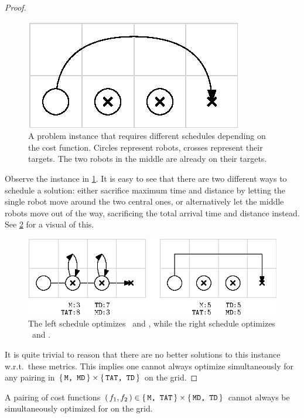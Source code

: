 \begin{proof}
	\begin{figure}[h]
		\centering
		\includegraphics[width=0.35\linewidth]{ipe/sim1_problem.eps}
		\caption{
			A problem instance that requires different schedules depending on the cost function. Circles represent robots, crosses represent their targets. The two robots in the middle are already on their targets.
		}
		\label{fig:simultaneous_problem_1}
	\end{figure}

	Observe the instance in \cref{fig:simultaneous_problem_1}. 
	It is easy to see that there are two different ways to schedule a solution: either sacrifice maximum time and distance by letting the single robot move around the two central ones, or alternatively let the middle robots move out of the way, sacrificing the total arrival time and distance instead.
	See \cref{fig:simumtaneous_strategies_1} for a visual of this.

	\begin{figure}[h]
		\centering
		\includegraphics[width=0.7\linewidth]{ipe/sim1_strat.eps}
		\caption{
			The left schedule optimizes \ and , while the right schedule optimizes \ and .
		}
		\label{fig:simumtaneous_strategies_1}
	\end{figure}

It is quite trivial to reason that there are no better solutions to this instance w.r.t.~these metrics.
This implies one cannot always optimize simultaneously for any pairing in \(\set{\texttt{M, MD}} \times \set{\texttt{TAT, TD}}\) on the grid.
\end{proof}

\begin{lemma}\label{lemma:simultaneous_pairings_2}
	A pairing of cost functions \((\, f_1, f_2 \,) \in \set{\texttt{M, TAT}} \times \set{\texttt{MD, TD}}\) cannot always be simultaneously optimized for on the grid.
\end{lemma}

